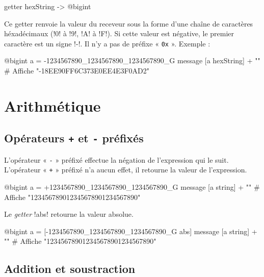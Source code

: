 \begin{galgas}
getter hexString -> @bigint
\end{galgas}

Ce getter renvoie la valeur du receveur sous la forme d'une chaîne de caractères héxadécimaux (\ggs!0! à \ggs!9!, \ggs!A! à \ggs!F!). Si cette valeur est négative, le premier caractère est un signe \ggs!-!. Il n'y a pas de préfixe « \texttt{0x} ». Exemple :

\begin{galgas}
@bigint a = -1234567890_1234567890_1234567890_G
message [a hexString] + "\n" # Affiche "-18EE90FF6C373E0EE4E3F0AD2"
\end{galgas}









\section{Arithmétique}


\subsection{Opérateurs \texttt{+} et \texttt{-} préfixés}

L'opérateur « \texttt{-} » préfixé effectue la négation de l'expression qui le suit. L'opérateur « \texttt{+} » préfixé n'a aucun effet, il retourne la valeur de l'expression.

\begin{galgas}
@bigint a = +1234567890_1234567890_1234567890_G
message [a string] + "\n" # Affiche "123456789012345678901234567890"
\end{galgas}










Le \emph{getter} \ggs!abs! retourne la valeur absolue.

\begin{galgas}
@bigint a = [-1234567890_1234567890_1234567890_G abs]
message [a string] + "\n" # Affiche "123456789012345678901234567890"
\end{galgas}






\subsection{Addition et soustraction}

